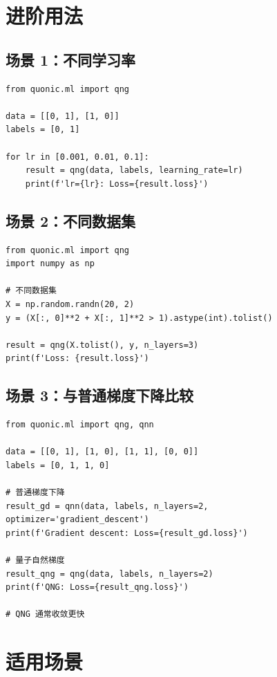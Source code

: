 \documentclass[12pt,a4paper]{article}
\begin{document}
\section{进阶用法}

\subsection{场景 1：不同学习率}

\begin{verbatim}
from quonic.ml import qng

data = [[0, 1], [1, 0]]
labels = [0, 1]

for lr in [0.001, 0.01, 0.1]:
    result = qng(data, labels, learning_rate=lr)
    print(f'lr={lr}: Loss={result.loss}')
\end{verbatim}

\subsection{场景 2：不同数据集}

\begin{verbatim}
from quonic.ml import qng
import numpy as np

# 不同数据集
X = np.random.randn(20, 2)
y = (X[:, 0]**2 + X[:, 1]**2 > 1).astype(int).tolist()

result = qng(X.tolist(), y, n_layers=3)
print(f'Loss: {result.loss}')
\end{verbatim}

\subsection{场景 3：与普通梯度下降比较}

\begin{verbatim}
from quonic.ml import qng, qnn

data = [[0, 1], [1, 0], [1, 1], [0, 0]]
labels = [0, 1, 1, 0]

# 普通梯度下降
result_gd = qnn(data, labels, n_layers=2, optimizer='gradient_descent')
print(f'Gradient descent: Loss={result_gd.loss}')

# 量子自然梯度
result_qng = qng(data, labels, n_layers=2)
print(f'QNG: Loss={result_qng.loss}')

# QNG 通常收敛更快
\end{verbatim}

\section{适用场景}
\end{document}
